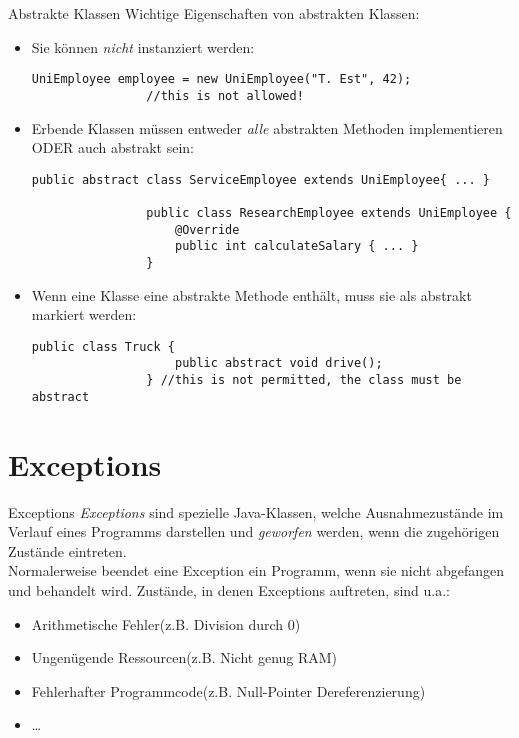 \begin{frame}[fragile]{Abstrakte Klassen}
    Wichtige Eigenschaften von abstrakten Klassen:
    \begin{itemize}[<+->]
        \item Sie können \textit{nicht} instanziert werden:
            \begin{lstlisting}[basicstyle=\ttfamily\scriptsize,gobble=16]
                UniEmployee employee = new UniEmployee("T. Est", 42);
                //this is not allowed!
            \end{lstlisting}
        \item Erbende Klassen müssen entweder \textit{alle} abstrakten Methoden implementieren ODER auch abstrakt sein:
           \begin{lstlisting}[basicstyle=\ttfamily\scriptsize,gobble=16]
                public abstract class ServiceEmployee extends UniEmployee{ ... }

                public class ResearchEmployee extends UniEmployee {
                    @Override
                    public int calculateSalary { ... }
                }
            \end{lstlisting}
        \item Wenn eine Klasse eine abstrakte Methode enthält, muss sie als abstrakt markiert werden:
            \begin{lstlisting}[basicstyle=\ttfamily\scriptsize,gobble=16]
                public class Truck {
                    public abstract void drive();
                } //this is not permitted, the class must be abstract
            \end{lstlisting}
    \end{itemize}
\end{frame}

\section{Exceptions}
\begin{frame}{Exceptions}
    \textit{Exceptions} sind spezielle Java-Klassen, welche Ausnahmezustände im Verlauf eines Programms darstellen
    und \textit{geworfen} werden, wenn die zugehörigen Zustände eintreten. \\
    Normalerweise beendet eine Exception ein Programm, wenn sie nicht abgefangen und behandelt wird.
    Zustände, in denen Exceptions auftreten, sind u.a.:
    \begin{itemize}[<+->]
        \item Arithmetische Fehler(z.B. Division durch 0)
        \item Ungenügende Ressourcen(z.B. Nicht genug RAM)
        \item Fehlerhafter Programmcode(z.B. Null-Pointer Dereferenzierung)
        \item \dots
    \end{itemize}
\end{frame}


